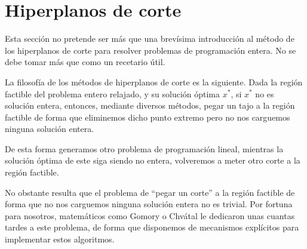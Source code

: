 \section{Hiperplanos de corte}
Esta sección no pretende ser más que una brevísima introducción al método de los hiperplanos de corte para resolver problemas de programación entera. No se debe tomar más que como un recetario útil.

\begin{obs}[Filosofía]
	La filosofía de los métodos de hiperplanos de corte es la siguiente. Dada la región factible del problema entero relajado, y su solución óptima $x^*$, si $x^*$ no es solución entera, entonces, mediante diversos métodos, pegar un tajo a la región factible de forma que eliminemos dicho punto extremo pero no nos carguemos ninguna solución entera.
	
	De esta forma generamos otro problema de programación lineal, mientras la solución óptima de este siga siendo no entera, volveremos a meter otro corte a la región factible.
\end{obs}
No obstante resulta que el problema de ``pegar un corte'' a la región factible de forma que no nos carguemos ninguna solución entera no es trivial. Por fortuna para nosotros, matemáticos como Gomory o Chvátal le dedicaron unas cuantas tardes a este problema, de forma que disponemos de mecanismos explícitos para implementar estos algoritmos.

